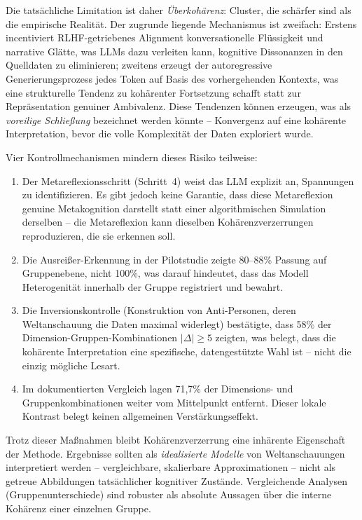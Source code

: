 \documentclass[11pt,a4paper]{article}
\begin{document}
Die tatsächliche Limitation ist daher \emph{Überkohärenz}: Cluster, die schärfer sind als die empirische Realität. Der zugrunde liegende Mechanismus ist zweifach: Erstens incentiviert RLHF-getriebenes Alignment konversationelle Flüssigkeit und narrative Glätte, was LLMs dazu verleiten kann, kognitive Dissonanzen in den Quelldaten zu eliminieren; zweitens erzeugt der autoregressive Generierungsprozess jedes Token auf Basis des vorhergehenden Kontexts, was eine strukturelle Tendenz zu kohärenter Fortsetzung schafft statt zur Repräsentation genuiner Ambivalenz. Diese Tendenzen können erzeugen, was als \emph{voreilige Schließung} bezeichnet werden könnte -- Konvergenz auf eine kohärente Interpretation, bevor die volle Komplexität der Daten exploriert wurde.

Vier Kontrollmechanismen mindern dieses Risiko teilweise:
\begin{enumerate}[nosep]
  \item Der Metareflexionsschritt (Schritt~4) weist das LLM explizit an, Spannungen zu identifizieren. Es gibt jedoch keine Garantie, dass diese Metareflexion genuine Metakognition darstellt statt einer algorithmischen Simulation derselben -- die Metareflexion kann dieselben Kohärenzverzerrungen reproduzieren, die sie erkennen soll.
  \item Die Ausreißer-Erkennung in der Pilotstudie zeigte 80--88\% Passung auf Gruppenebene, nicht 100\%, was darauf hindeutet, dass das Modell Heterogenität innerhalb der Gruppe registriert und bewahrt.
  \item Die Inversionskontrolle (Konstruktion von Anti-Personen, deren Weltanschauung die Daten maximal widerlegt) bestätigte, dass 58\% der Dimension-Gruppen-Kombinationen $|\Delta| \geq 5$ zeigten, was belegt, dass die kohärente Interpretation eine spezifische, datengestützte Wahl ist -- nicht die einzig mögliche Lesart.
  \item Im dokumentierten Vergleich lagen 71,7\% der Dimensions- und Gruppenkombinationen weiter vom Mittelpunkt entfernt. Dieser lokale Kontrast belegt keinen allgemeinen Verstärkungseffekt.
\end{enumerate}

Trotz dieser Maßnahmen bleibt Kohärenzverzerrung eine inhärente Eigenschaft der Methode. Ergebnisse sollten als \emph{idealisierte Modelle} von Weltanschauungen interpretiert werden -- vergleichbare, skalierbare Approximationen -- nicht als getreue Abbildungen tatsächlicher kognitiver Zustände. Vergleichende Analysen (Gruppenunterschiede) sind robuster als absolute Aussagen über die interne Kohärenz einer einzelnen Gruppe.
\end{document}
